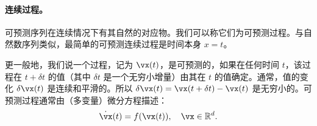 \documentclass[../../book-main.tex]{subfiles}
\begin{document}

\paragraph{连续过程。}
可预测序列在连续情况下有其自然的对应物。我们可以称它们为可预测过程。与自然数序列类似，最简单的可预测连续过程是时间本身 $x=t$。

更一般地，我们说一个过程，记为 $\vx(t)$，是可预测的，如果在任何时间 $t$，该过程在 $t+\delta t$ 的值（其中 $\delta t$ 是一个无穷小增量）由其在 $t$ 的值确定。通常，值的变化 $\delta \vx(t)$ 是连续和平滑的。所以 $\delta \vx(t) = \vx(t + \delta t) - \vx(t)$ 是无穷小的。可预测过程通常由（多变量）微分方程描述：
\begin{equation}
    \dot{\vx}(t) = f(\vx(t)), \quad \vx \in \mathbb{R}^d. 
    \label{eqn:process}
\end{equation}
\end{document}
